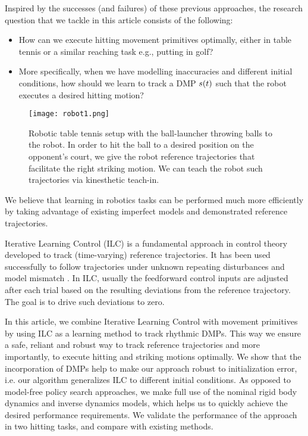 Inspired by the successes (and failures) of these previous approaches, the research question that we tackle in this article consists of the following:
%
\begin{itemize}
\item How can we execute hitting movement primitives optimally, either in table tennis or a similar reaching task e.g., putting in golf?
%
\item More specifically, when we have modelling inaccuracies and different initial conditions, how should we learn to track a DMP $s(t)$ such that the robot executes a desired hitting motion?
\end{itemize}
%
\begin{figure}[b!]
\center
\texttt{[image: robot1.png]}			
\caption{Robotic table tennis setup with the ball-launcher throwing balls to the robot. In order to hit the ball to a desired position on the opponent's court, we give the robot reference trajectories that facilitate the right striking motion. We can teach the robot such trajectories via kinesthetic teach-in.}
\label{robot}
\end{figure}
%
\noindent We believe that learning in robotics tasks can be performed much more efficiently by taking advantage of existing imperfect models and demonstrated reference trajectories. 

Iterative Learning Control (ILC) is a fundamental approach in control theory developed to track (time-varying) reference trajectories. It has been used successfully to follow trajectories under unknown repeating disturbances and model mismatch \cite{Bristow06}. In ILC, usually the feedforward control inputs are adjusted after each trial based on the resulting deviations from the reference trajectory. The goal is to drive such deviations to zero. 

In this article, we combine Iterative Learning Control with movement primitives by using ILC as a learning method to track rhythmic DMPs. This way we ensure a safe, reliant and robust way to track reference trajectories and more importantly, to execute hitting and striking motions optimally. We show that the incorporation of DMPs help to make our approach robust to initialization error, i.e. our algorithm generalizes ILC to different initial conditions. As opposed to model-free policy search approaches, we make full use of the nominal rigid body dynamics and inverse dynamics models, which helps us to quickly achieve the desired performance requirements. We validate the performance of the approach in two hitting tasks, and compare with existing methods.

